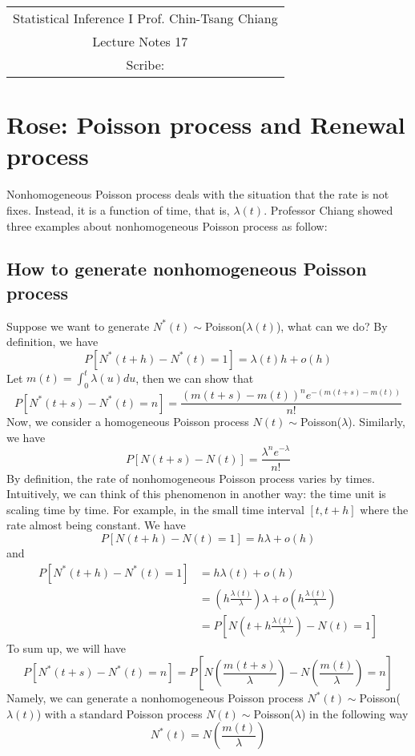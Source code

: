 \documentclass[../Distributions.tex]{subfiles}
\begin{document}
	\begin{center}
		\renewcommand{\arraystretch}{2}
		\begin{bfseries}
			\begin{tabular}{|c|}
				\hline
				Statistical Inference I \hfill Prof. Chin-Tsang Chiang\\
				\hspace{15em} {\large Lecture Notes 17} \hspace{15em}\ \\
				\lecdate \hfill Scribe: \scribe\\
				\hline
			\end{tabular}
			\renewcommand{\arraystretch}{1}
		\end{bfseries}
	\end{center}

\section{Rose: Poisson process and Renewal process}
Nonhomogeneous Poisson process deals with the situation that the rate is not fixes. Instead, it is a function of time, that is, $\lambda(t)$. Professor Chiang showed three examples about nonhomogeneous Poisson process as follow:
\subsection{How to generate nonhomogeneous Poisson process}
Suppose we want to generate $N^*(t)\sim$Poisson($\lambda(t)$), what can we do? By definition, we have
$$P[N^*(t+h)-N^*(t) = 1] = \lambda(t)h+o(h)$$
Let $m(t) = \int_0^t\lambda(u)du$, then we can show that
$$P[N^*(t+s)-N^*(t)=n] = \frac{(m(t+s)-m(t))^ne^{-(m(t+s)-m(t))}}{n!}$$
Now, we consider a homogeneous Poisson process $N(t)\sim$Poisson($\lambda$). Similarly, we have
$$P[N(t+s)-N(t)] = \frac{\lambda^n e^{-\lambda}}{n!}$$
By definition, the rate of nonhomogeneous Poisson process varies by times. Intuitively, we can think of this phenomenon in another way: the time unit is scaling time by time. For example, in the small time interval $[t,t+h]$ where the rate almost being constant. We have
$$P[N(t+h)-N(t)=1]=h\lambda+o(h)$$
and
\begin{align*}
P[N^*(t+h)-N^*(t)=1] &= h\lambda(t)+o(h)\\
&=(h\frac{\lambda(t)}{\lambda})\lambda + o(h\frac{\lambda(t)}{\lambda})\\
&=P[N(t+h\frac{\lambda(t)}{\lambda}) - N(t)=1]
\end{align*}
To sum up, we will have
$$P[N^*(t+s)-N^*(t) = n] = P[N(\frac{m(t+s)}{\lambda}) - N(\frac{m(t)}{\lambda}) = n]$$
Namely, we can generate a nonhomogeneous Poisson process $N^*(t)\sim$Poisson($\lambda(t)$) with a standard Poisson process $N(t)\sim$Poisson($\lambda$) in the following way
$$N^*(t) = N(\frac{m(t)}{\lambda})$$
\end{document}
